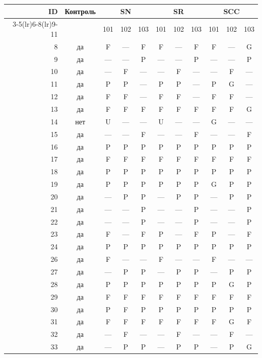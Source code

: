 \begin{table}[p]\centering\small
\begin{tabular*}{\textwidth}{@{\extracolsep{\fill}}rc*{9}{c}@{}}\toprule
ID & Контроль & \multicolumn{3}{c}{SN} & \multicolumn{3}{c}{SR} & \multicolumn{3}{c}{SCC}\\
\cmidrule(lr){3-5}\cmidrule(lr){6-8}\cmidrule(lr){9-11}
 & & 101 & 102 & 103 & 101 & 102 & 103 & 101 & 102 & 103\\\midrule
8 & да & F & — & F & F & — & F & F & — & G\\
9 & да & — & — & P & — & — & P & — & — & P\\
10 & да & — & F & — & — & F & — & — & F & —\\
11 & да & P & P & — & P & P & — & P & G & —\\
12 & да & F & F & — & F & F & — & F & F & —\\
13 & да & F & F & F & F & F & F & F & F & G\\
14 & нет & U & — & — & U & — & — & G & — & —\\
15 & да & — & — & F & — & — & F & — & — & F\\
16 & да & P & P & P & P & P & P & P & P & P\\
17 & да & F & F & F & F & F & F & F & F & F\\
18 & да & P & P & P & P & P & P & P & P & P\\
19 & да & P & P & P & P & P & P & G & P & P\\
20 & да & — & P & P & — & P & P & — & P & P\\
21 & да & — & — & P & — & — & P & — & — & P\\
22 & да & — & — & P & — & — & P & — & — & P\\
23 & да & F & — & F & P & — & F & P & — & F\\
24 & да & P & P & P & P & P & P & P & P & P\\
26 & да & F & — & — & F & — & — & F & — & —\\
27 & да & — & P & P & — & P & P & — & P & P\\
28 & да & P & P & P & P & P & P & P & G & P\\
29 & да & F & F & F & F & F & F & F & F & F\\
30 & да & P & F & P & P & P & P & P & P & P\\
31 & да & F & F & F & F & F & F & F & G & F\\
32 & да & — & F & — & — & F & — & — & F & —\\
33 & да & — & P & P & — & P & P & — & P & G\\

\end{tabular*}
\end{table}
